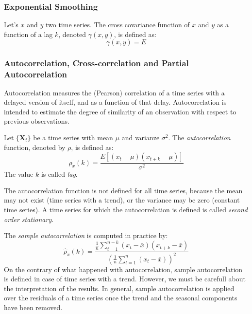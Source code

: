 \subsubsection{Exponential Smoothing}

\begin{definition}
Let's $x$ and $y$ two time series. The cross covariance function of $x$ and $y$ as a function of a lag $k$, denoted $\gamma \left( x, y \right)$, is defined as:
\[
    \gamma \left( x, y \right) = E 
\] 

\end{definition}

\begin{definition}

\end{definition}

%
% 
\subsubsection{Autocorrelation, Cross-correlation and Partial Autocorrelation}
\label{sub:autocorrelation}

Autocorrelation measures the (Pearson) correlation of a time series with a delayed version of itself, and as a function of that delay. Autocorrelation is intended to estimate the degree of similarity of an observation with respect to previous observations.

\begin{definition}
Let $\{\mathbf{X}_t\}$ be a time series with mean $\mu$ and varianze $\sigma^2$. The \emph{autocorrelation} function, denoted by $\rho$, is defined as:
\[
\rho_x(k) = \frac{E\left[\left(x_{t}-\mu\right)\left(x_{t+k}-\mu\right)\right]}{\sigma^{2}}
\]
The value $k$ is called \emph{lag}.
\end{definition}

The autocorrelation function is not defined for all time series, because the mean may not exist (time series with a trend), or the variance may be zero (constant time series). A time series for which the autocorrelation is defined is called \emph{second order stationary}.

The \emph{sample autocorrelation} is computed in practice by:
\[
\hat{\rho}_x(k) = \frac{ \frac{1}{n}\sum_{t=1}^{n-k}\left(x_{t}-\bar{x}\right)\left(x_{t+k}-\bar{x}\right) }{ \left( \frac{1}{n}\sum_{t=1}^{n}\left(x_{t}-\bar{x}\right) \right)^2 }
\]
On the contrary of what happened with autocorrelation, sample autocorrelation is defined in case of time series with a trend. However, we must be carefull about the interpretation of the results. In general, sample autocorrelation is applied over the residuals of a time series once the trend and the seasonal components have been removed.

